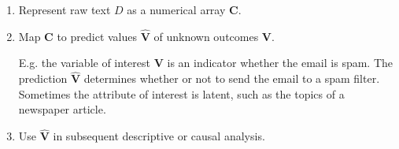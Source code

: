 \documentclass[12pt,a4paper,notitlepage]{article}
\begin{document}
\begin{enumerate}
	\item Represent raw text $D$ as a numerical array $\boldsymbol{C}$. 
	 
	\item Map $\boldsymbol{C}$ to predict values $\boldsymbol{\hat{V}}$ of unknown outcomes $\boldsymbol{V}$. 
	
	E.g. the variable of interest $\boldsymbol{V}$ is an indicator whether the email is spam. The prediction $\boldsymbol{\hat{V}}$ determines whether or not to send the email to a spam filter. Sometimes the attribute of interest is latent, such as the topics of a newspaper article.
	\item Use $\boldsymbol{\hat{V}}$ in subsequent descriptive or causal analysis.
\end{enumerate}
\end{document}
